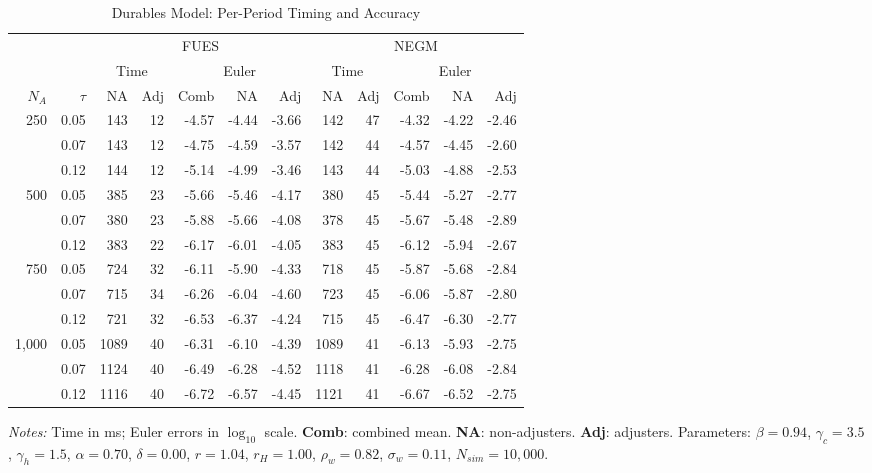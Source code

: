 \documentclass[11pt]{article}
\begin{document}
\pagestyle{empty}
\begin{table}[htbp]
\centering
\begingroup
\small
\setlength{\tabcolsep}{3pt}
\renewcommand{\arraystretch}{1.05}
\caption{Durables Model: Per-Period Timing and Accuracy}
\label{table:housing1}
\begin{tabular}{@{}rr rrrrr rrrrr@{}}
\toprule
& & \multicolumn{5}{c}{FUES} & \multicolumn{5}{c}{NEGM} \\
\cmidrule(lr){3-7} \cmidrule(lr){8-12}
& & \multicolumn{2}{c}{Time} & \multicolumn{3}{c}{Euler} & \multicolumn{2}{c}{Time} & \multicolumn{3}{c}{Euler} \\
\cmidrule(lr){3-4} \cmidrule(lr){5-7} \cmidrule(lr){8-9} \cmidrule(lr){10-12}
$N_A$ & $\tau$ & NA & Adj & Comb & NA & Adj & NA & Adj & Comb & NA & Adj \\
\midrule
250 & 0.05 & 143 & 12 & -4.57 & -4.44 & -3.66 & 142 & 47 & -4.32 & -4.22 & -2.46 \\
 & 0.07 & 143 & 12 & -4.75 & -4.59 & -3.57 & 142 & 44 & -4.57 & -4.45 & -2.60 \\
 & 0.12 & 144 & 12 & -5.14 & -4.99 & -3.46 & 143 & 44 & -5.03 & -4.88 & -2.53 \\
\midrule
500 & 0.05 & 385 & 23 & -5.66 & -5.46 & -4.17 & 380 & 45 & -5.44 & -5.27 & -2.77 \\
 & 0.07 & 380 & 23 & -5.88 & -5.66 & -4.08 & 378 & 45 & -5.67 & -5.48 & -2.89 \\
 & 0.12 & 383 & 22 & -6.17 & -6.01 & -4.05 & 383 & 45 & -6.12 & -5.94 & -2.67 \\
\midrule
750 & 0.05 & 724 & 32 & -6.11 & -5.90 & -4.33 & 718 & 45 & -5.87 & -5.68 & -2.84 \\
 & 0.07 & 715 & 34 & -6.26 & -6.04 & -4.60 & 723 & 45 & -6.06 & -5.87 & -2.80 \\
 & 0.12 & 721 & 32 & -6.53 & -6.37 & -4.24 & 715 & 45 & -6.47 & -6.30 & -2.77 \\
\midrule
1,000 & 0.05 & 1089 & 40 & -6.31 & -6.10 & -4.39 & 1089 & 41 & -6.13 & -5.93 & -2.75 \\
 & 0.07 & 1124 & 40 & -6.49 & -6.28 & -4.52 & 1118 & 41 & -6.28 & -6.08 & -2.84 \\
 & 0.12 & 1116 & 40 & -6.72 & -6.57 & -4.45 & 1121 & 41 & -6.67 & -6.52 & -2.75 \\
\bottomrule
\end{tabular}
\vspace{0.3em}
\par\small \textit{Notes:} Time in ms; Euler errors in $\log_{10}$ scale. \textbf{Comb}: combined mean. \textbf{NA}: non-adjusters. \textbf{Adj}: adjusters. Parameters: $\beta=0.94$, $\gamma_c=3.5$, $\gamma_h=1.5$, $\alpha=0.70$, $\delta=0.00$, $r=1.04$, $r_H=1.00$, $\rho_w=0.82$, $\sigma_w=0.11$, $N_{sim}=10,000$.
\endgroup
\end{table}
\end{document}
